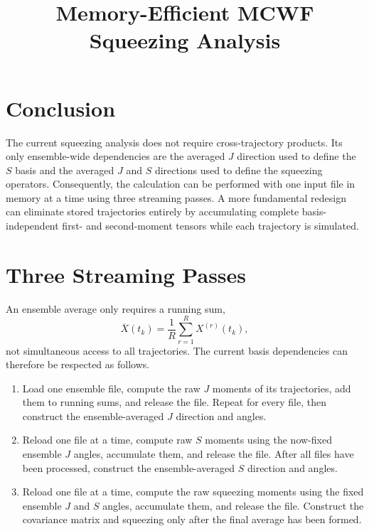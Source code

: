 \documentclass[11pt]{article}
\title{Memory-Efficient MCWF Squeezing Analysis}
\author{}
\date{}
\begin{document}
\maketitle

\section{Conclusion}

The current squeezing analysis does not require cross-trajectory products.
Its only ensemble-wide dependencies are the averaged $J$ direction used to
define the $S$ basis and the averaged $J$ and $S$ directions used to define
the squeezing operators.  Consequently, the calculation can be performed
with one input file in memory at a time using three streaming passes.  A more
fundamental redesign can eliminate stored trajectories entirely by
accumulating complete basis-independent first- and second-moment tensors while
each trajectory is simulated.

\section{Three Streaming Passes}

An ensemble average only requires a running sum,
\begin{equation}
  \overline{X}(t_k)
  = \frac{1}{R}\sum_{r=1}^{R}X^{(r)}(t_k),
\end{equation}
not simultaneous access to all trajectories.  The current basis dependencies
can therefore be respected as follows.

\begin{enumerate}
  \item Load one ensemble file, compute the raw $J$ moments of its
  trajectories, add them to running sums, and release the file.  Repeat for
  every file, then construct the ensemble-averaged $J$ direction and angles.

  \item Reload one file at a time, compute raw $S$ moments using the now-fixed
  ensemble $J$ angles, accumulate them, and release the file.  After all files
  have been processed, construct the ensemble-averaged $S$ direction and
  angles.

  \item Reload one file at a time, compute the raw squeezing moments using the
  fixed ensemble $J$ and $S$ angles, accumulate them, and release the file.
  Construct the covariance matrix and squeezing only after the final average
  has been formed.
\end{enumerate}
\end{document}
